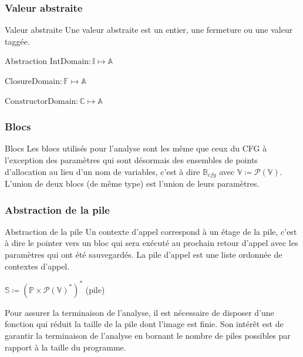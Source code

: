 \documentclass{beamer}
\begin{document}
\subsubsection{Valeur abstraite}

\begin{frame}{Valeur abstraite}
    Une valeur abstraite est un entier, une fermeture ou une valeur taggée.

    \begin{block}{Abstraction}
        $\text{IntDomain} : \mathbb{I} \mapsto \mathbb{A}$

        $\text{ClosureDomain} : \mathbb{F} \mapsto \mathbb{A}$

        $\text{ConstructorDomain} : \mathbb{C} \mapsto \mathbb{A}$
    \end{block}
\end{frame}

\subsubsection{Blocs}

\begin{frame}{Blocs}
    Les blocs utilisés pour l'analyse sont les même que ceux du CFG à l'exception des paramètres qui sont désormais des ensembles de points d'allocation au lieu d'un nom de variables, c'est à dire $\mathbb{B}_{cfg}$ avec $\mathbb{V} \coloneqq \mathcal{P}(\mathbb{V})$. L'union de deux blocs (de même type) est l'union de leurs paramètres.
\end{frame}

\subsubsection{Abstraction de la pile}

\begin{frame}{Abstraction de la pile}
    Un contexte d'appel correspond à un étage de la pile, c'est à dire le pointer vers un bloc qui sera exécuté au prochain retour d'appel avec les paramètres qui ont été sauvegardés. La pile d'appel est une liste ordonnée de contextes d'appel.

    $\mathbb{S} \coloneqq (\mathbb{P} \times \mathcal{P}(\mathbb{V})^{*})^{*}$ (pile)

    Pour assurer la terminaison de l'analyse, il est nécessaire de disposer d'une fonction qui réduit la taille de la pile dont l'image est finie. Son intérêt est de garantir la terminaison de l'analyse en bornant le nombre de piles possibles par rapport à la taille du programme.
\end{frame}
\end{document}
